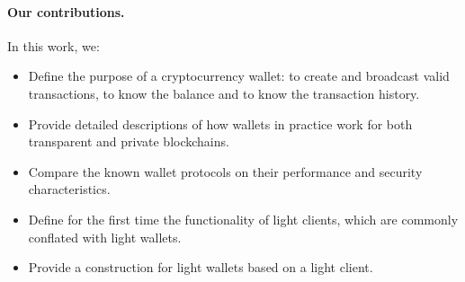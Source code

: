 \paragraph{Our contributions.} In this work, we:
\begin{itemize}
    \item Define the purpose of a cryptocurrency wallet: to create and broadcast valid transactions, to know the balance and to know the transaction history.
    \item Provide detailed descriptions of how wallets in practice work for both transparent and private blockchains.
    \item Compare the known wallet protocols on their performance and security characteristics.
    \item Define for the first time the functionality of light clients, which are commonly conflated with light wallets.
    \item Provide a construction for light wallets based on a light client.
\end{itemize}
